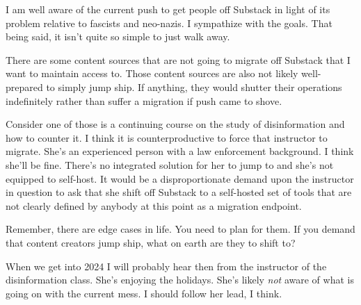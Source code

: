 I am well aware of the current push to get people off Substack in light
of its problem relative to fascists and neo-nazis. I sympathize with the
goals. That being said, it isn't quite so simple to just walk away.

There are some content sources that are not going to migrate off
Substack that I want to maintain access to. Those content sources are
also not likely well-prepared to simply jump ship. If anything, they
would shutter their operations indefinitely rather than suffer a
migration if push came to shove.

Consider one of those is a continuing course on the study of
disinformation and how to counter it. I think it is counterproductive to
force that instructor to migrate. She's an experienced person with a law
enforcement background. I think she'll be fine. There's no integrated
solution for her to jump to and she's not equipped to self-host. It
would be a disproportionate demand upon the instructor in question to
ask that she shift off Substack to a self-hosted set of tools that are
not clearly defined by anybody at this point as a migration endpoint.

Remember, there are edge cases in life. You need to plan for them. If
you demand that content creators jump ship, what on earth are they to
shift to?

When we get into 2024 I will probably hear then from the instructor of
the disinformation class. She's enjoying the holidays. She's likely
\emph{not} aware of what is going on with the current mess. I should
follow her lead, I think.
